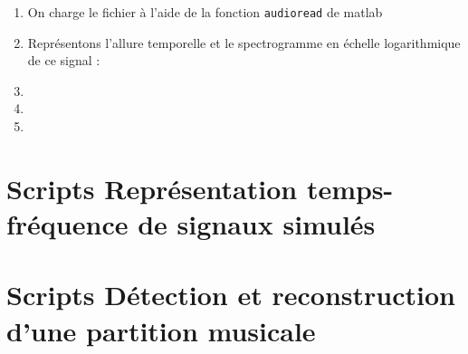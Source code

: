 \documentclass[12pt,a4paper,titlepage]{article}
\begin{document}
\begin{enumerate}

    \item{On charge le fichier à l'aide de la fonction \texttt{audioread} de matlab}

    \item{Représentons l'allure temporelle et le spectrogramme en échelle logarithmique de ce signal :

        }

    \item{}

    \item{}

    \item{}

\end{enumerate}

\begin{appendices}

    \section{Scripts Représentation temps-fréquence de signaux simulés}

    

    \section{Scripts Détection et reconstruction d'une partition musicale}

    

\end{appendices}
\end{document}
